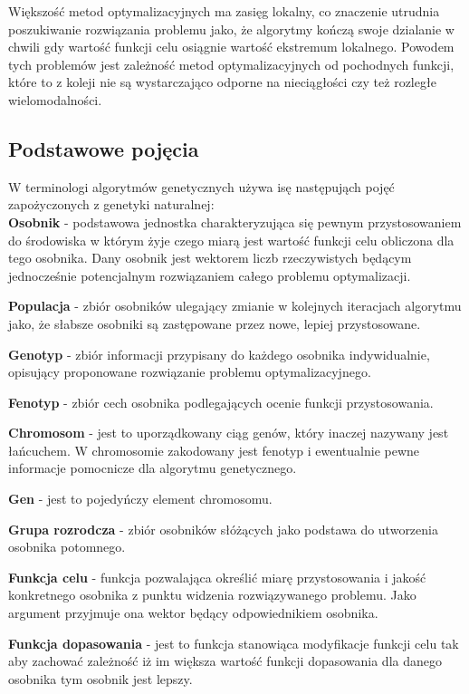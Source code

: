 Większość metod optymalizacyjnych ma zasięg lokalny, co znaczenie utrudnia poszukiwanie rozwiązania problemu jako, że algorytmy kończą swoje dzialanie w chwili gdy wartość funkcji celu osiągnie wartość ekstremum lokalnego. Powodem tych problemów jest zależność metod optymalizacyjnych od pochodnych funkcji, które to z koleji nie są wystarczająco odporne na nieciągłości czy też rozległe wielomodalności.
\par

\subsection{Podstawowe pojęcia}
W terminologi algorytmów genetycznych używa isę następująch pojęć zapożyczonych z genetyki naturalnej:\\

\textbf{Osobnik} - podstawowa jednostka charakteryzująca się pewnym przystosowaniem do środowiska w którym żyje czego miarą jest wartość funkcji celu obliczona dla tego osobnika. Dany osobnik jest wektorem liczb rzeczywistych będącym jednocześnie potencjalnym rozwiązaniem całego problemu optymalizacji.

\textbf{Populacja} - zbiór osobników ulegający zmianie w kolejnych iteracjach algorytmu jako, że słabsze osobniki są zastępowane przez nowe, lepiej przystosowane.

\textbf{Genotyp} - zbiór informacji przypisany do każdego osobnika indywidualnie, opisujący proponowane rozwiązanie problemu optymalizacyjnego.

\textbf{Fenotyp} - zbiór cech osobnika podlegających ocenie funkcji przystosowania.

\textbf{Chromosom} - jest to uporządkowany ciąg genów, który inaczej nazywany jest łańcuchem. W chromosomie zakodowany jest fenotyp i ewentualnie pewne informacje pomocnicze dla algorytmu genetycznego.

\textbf{Gen} - jest to pojedyńczy element chromosomu.

\textbf{Grupa rozrodcza} - zbiór osobników słóżących jako podstawa do utworzenia osobnika potomnego.

\textbf{Funkcja celu} - funkcja pozwalająca określić miarę przystosowania i jakość konkretnego osobnika z punktu widzenia rozwiązywanego problemu. Jako argument przyjmuje ona wektor będący odpowiednikiem osobnika.

\textbf{Funkcja dopasowania} - jest to funkcja stanowiąca modyfikacje funkcji celu tak aby zachować zależność iż im większa wartość funkcji dopasowania dla danego osobnika tym osobnik jest lepszy.

